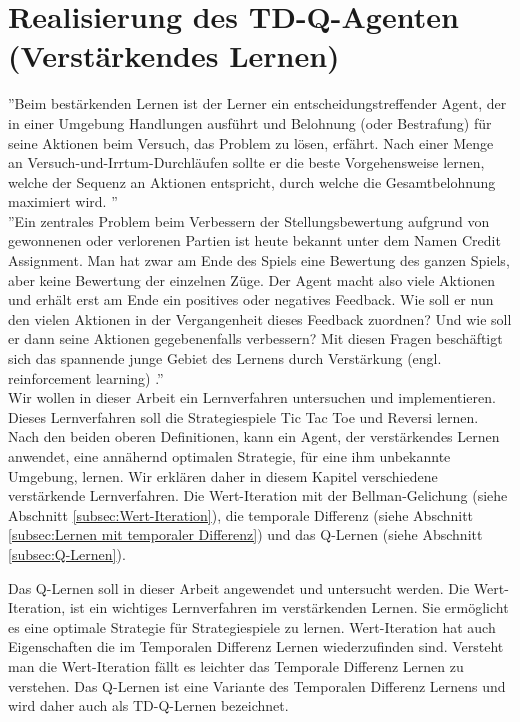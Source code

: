 \chapter{Realisierung des TD-Q-Agenten (Verstärkendes Lernen)}
\label{cha:Realisierung des TD-Q-Agenten}
''Beim bestärkenden Lernen ist der Lerner ein entscheidungstreffender Agent, der in einer Umgebung Handlungen ausführt und Belohnung (oder Bestrafung) für seine Aktionen beim Versuch, das Problem zu lösen, erfährt. Nach einer Menge an Versuch-und-Irrtum-Durchläufen sollte er die beste Vorgehensweise lernen, welche der Sequenz an Aktionen entspricht, durch welche die Gesamtbelohnung maximiert wird. \cite[397]{Alpaydin}'' \\

''Ein zentrales Problem beim Verbessern der Stellungsbewertung aufgrund von gewonnenen oder verlorenen Partien ist heute bekannt unter dem Namen Credit Assignment. Man hat zwar am Ende des Spiels eine Bewertung des ganzen Spiels, aber keine Bewertung der einzelnen Züge. Der Agent macht also viele Aktionen und erhält erst am Ende ein positives oder negatives Feedback. Wie soll er nun den vielen Aktionen in der Vergangenheit dieses Feedback zuordnen? Und wie soll er dann seine Aktionen gegebenenfalls verbessern? Mit diesen Fragen beschäftigt sich das spannende junge Gebiet des Lernens durch Verstärkung (engl. reinforcement learning) \cite[120]{Ertel}.'' \\

Wir wollen in dieser Arbeit ein Lernverfahren untersuchen und implementieren. Dieses Lernverfahren soll die Strategiespiele Tic Tac Toe und Reversi lernen. Nach den beiden oberen Definitionen, kann ein Agent, der verstärkendes Lernen anwendet, eine annähernd optimalen Strategie, für eine ihm unbekannte Umgebung, lernen. Wir erklären daher in diesem Kapitel verschiedene verstärkende Lernverfahren. Die Wert-Iteration mit der Bellman-Gelichung (siehe Abschnitt \ref{subsec:Wert-Iteration}), die temporale Differenz (siehe Abschnitt \ref{subsec:Lernen mit temporaler Differenz}) und das Q-Lernen (siehe Abschnitt \ref{subsec:Q-Lernen}). \\
\newpage

Das Q-Lernen soll in dieser Arbeit angewendet und untersucht werden. Die Wert-Iteration, ist ein wichtiges Lernverfahren im verstärkenden Lernen. Sie ermöglicht es eine optimale Strategie für Strategiespiele zu lernen. Wert-Iteration hat auch Eigenschaften die im Temporalen Differenz Lernen wiederzufinden sind. Versteht man die Wert-Iteration fällt es leichter das Temporale Differenz Lernen zu verstehen. Das Q-Lernen ist eine Variante des Temporalen Differenz Lernens und wird daher auch als TD-Q-Lernen bezeichnet. \\


